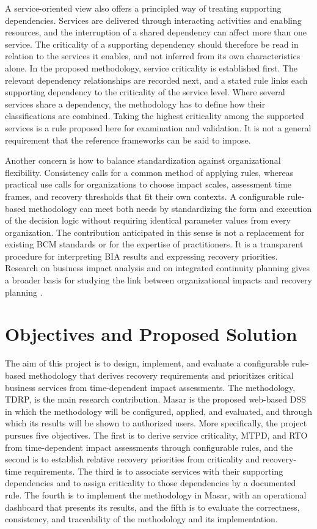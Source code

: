 A service-oriented view also offers a principled way of treating supporting dependencies. Services are delivered through interacting activities and enabling resources, and the interruption of a shared dependency can affect more than one service. The criticality of a supporting dependency should therefore be read in relation to the services it enables, and not inferred from its own characteristics alone. In the proposed methodology, service criticality is established first. The relevant dependency relationships are recorded next, and a stated rule links each supporting dependency to the criticality of the service level. Where several services share a dependency, the methodology has to define how their classifications are combined. Taking the highest criticality among the supported services is a rule proposed here for examination and validation. It is not a general requirement that the reference frameworks can be said to impose.

Another concern is how to balance standardization against organizational flexibility. Consistency calls for a common method of applying rules, whereas practical use calls for organizations to choose impact scales, assessment time frames, and recovery thresholds that fit their own contexts. A configurable rule-based methodology can meet both needs by standardizing the form and execution of the decision logic without requiring identical parameter values from every organization. The contribution anticipated in this sense is not a replacement for existing BCM standards or for the expertise of practitioners. It is a transparent procedure for interpreting BIA results and expressing recovery priorities. Research on business impact analysis and on integrated continuity planning gives a broader basis for studying the link between organizational impacts and recovery planning \cite{torabi2014framework,sahebjamnia2015integrated}.

\section{Objectives and Proposed Solution}
\label{sec:objectives_solution}

The aim of this project is to design, implement, and evaluate a configurable rule-based methodology that derives recovery requirements and prioritizes critical business services from time-dependent impact assessments. The methodology, TDRP, is the main research contribution. Masar is the proposed web-based DSS in which the methodology will be configured, applied, and evaluated, and through which its results will be shown to authorized users. More specifically, the project pursues five objectives. The first is to derive service criticality, MTPD, and RTO from time-dependent impact assessments through configurable rules, and the second is to establish relative recovery priorities from criticality and recovery-time requirements. The third is to associate services with their supporting dependencies and to assign criticality to those dependencies by a documented rule. The fourth is to implement the methodology in Masar, with an operational dashboard that presents its results, and the fifth is to evaluate the correctness, consistency, and traceability of the methodology and its implementation.

